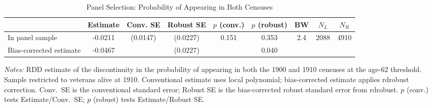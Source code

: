 \begin{table}[htbp]
\centering
\caption{Panel Selection: Probability of Appearing in Both Censuses}
\label{tab:panel_selection}
\begin{tabular}{lcccccccc}
\toprule
  & Estimate & Conv. SE & Robust SE & $p$ (conv.) & $p$ (robust) & BW & $N_L$ & $N_R$ \\
\midrule
  In panel sample & -0.0211 & (0.0147) & (0.0227) & 0.151 & 0.353 & 2.4 & 2088 & 4910 \\
\midrule
  Bias-corrected estimate & -0.0467 & & (0.0227) & & 0.040 & & & \\
\bottomrule
\end{tabular}
\begin{tablenotes}[flushleft]
\small
\item \textit{Notes:} RDD estimate of the discontinuity in the probability of appearing in both the 1900 and 1910 censuses at the age-62 threshold. Sample restricted to veterans alive at 1910. Conventional estimate uses local polynomial; bias-corrected estimate applies rdrobust correction. Conv.\ SE is the conventional standard error; Robust SE is the bias-corrected robust standard error from rdrobust. $p$ (conv.) tests Estimate/Conv.\ SE; $p$ (robust) tests Estimate/Robust SE.
\end{tablenotes}
\end{table}
